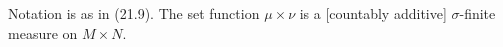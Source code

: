 Notation is as in (21.9). The set function $\mu \times \nu$ is a [countably additive] $\sigma$-finite measure on $M \times N$.